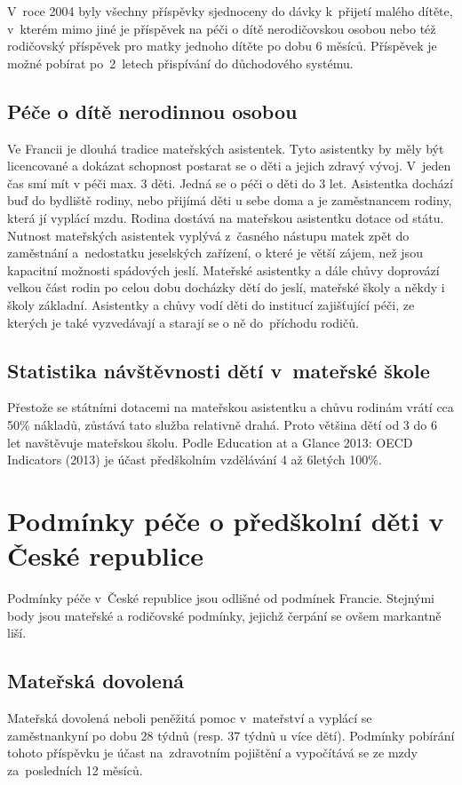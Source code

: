 				V roce 2004 byly všechny příspěvky sjednoceny do dávky k přijetí malého dítěte, v kterém mimo jiné je příspěvek na péči o dítě nerodičovskou osobou nebo též rodičovský příspěvek pro matky jednoho dítěte po dobu 6 měsíců. Příspěvek je možné pobírat po 2 letech přispívání do důchodového systému.

			\subsection{Péče o dítě nerodinnou osobou}
				Ve Francii je dlouhá tradice mateřských asistentek. Tyto asistentky by měly být licencované a dokázat schopnost postarat se o děti a jejich zdravý vývoj. V jeden čas smí mít v péči max. 3 děti. Jedná se o péči o děti do 3 let. Asistentka dochází buď do bydliště rodiny, nebo přijímá děti u sebe doma a je zaměstnancem rodiny, která jí vyplácí mzdu. Rodina dostává na mateřskou asistentku dotace od státu.
				Nutnost mateřských asistentek vyplývá z časného nástupu matek zpět do zaměstnání a nedostatku jeselských zařízení, o které je větší zájem, než jsou kapacitní možnosti spádových jeslí. Mateřské asistentky a dále chůvy doprovází velkou část rodin po celou dobu docházky dětí do jeslí, mateřské školy a někdy i školy základní. Asistentky a chůvy vodí děti do institucí zajišťující péči, ze kterých je také vyzvedávají a starají se o ně do příchodu rodičů.

			\subsection{Statistika návštěvnosti dětí v mateřské škole}
				Přestože se státními dotacemi na mateřskou asistentku a chůvu rodinám vrátí cca 50\% nákladů, zůstává tato služba relativně drahá. Proto většina dětí od 3 do 6 let navštěvuje mateřskou školu. Podle Education at a Glance 2013: OECD Indicators (2013) je účast předškolním vzdělávání 4 až 6letých 100\%.

		\section{Podmínky péče o předškolní děti v České republice}
			Podmínky péče v České republice jsou odlišné od podmínek Francie. Stejnými body jsou mateřské a rodičovské podmínky, jejichž čerpání se ovšem markantně liší.

			\subsection{Mateřská dovolená}
				Mateřská dovolená neboli peněžitá pomoc v mateřství a vyplácí se zaměstnankyní po dobu 28 týdnů (resp. 37 týdnů u více dětí). Podmínky pobírání tohoto příspěvku je účast na zdravotním pojištění a vypočítává se ze mzdy za posledních 12 měsíců.

